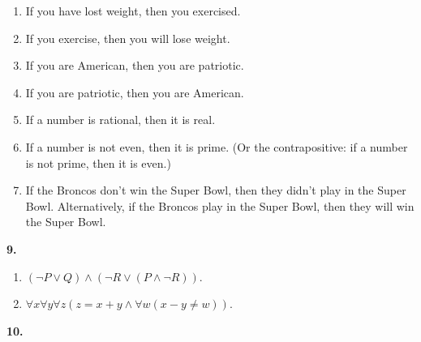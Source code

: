 \documentclass[10pt,]{book}
\theoremstyle{plain}
\theoremstyle{definition}
\theoremstyle{definition}
\theoremstyle{definition}
\numberwithin{equation}{chapter}
\begin{document}
\begin{enumerate}[label=(\alph*)]
\item\hypertarget{li-1160}{}
                If you have lost weight, then you exercised.
\item\hypertarget{li-1161}{}
                If you exercise, then you will lose weight.
\item\hypertarget{li-1162}{}
                If you are American, then you are patriotic.
\item\hypertarget{li-1163}{}
                If you are patriotic, then you are American.
\item\hypertarget{li-1164}{}
                If a number is rational, then it is real.
\item\hypertarget{li-1165}{}
                If a number is not even, then it is prime. (Or the contrapositive: if a number is not prime, then it is even.)
\item\hypertarget{li-1166}{}
                If the Broncos don't win the Super Bowl, then they didn't play in the Super Bowl. Alternatively, if the Broncos play in the Super Bowl, then they will win the Super Bowl.
\end{enumerate}
\par\smallskip
\noindent\textbf{9.}\quad{}\leavevmode%
\begin{enumerate}[label=(\alph*)]
\item\hypertarget{li-1169}{}\((\neg P \vee Q) \wedge (\neg R \vee (P \wedge \neg R))\).%
\item\hypertarget{li-1170}{}\(\forall x \forall y \forall z (z = x+y \wedge \forall w (x-y \ne w))\).%
\end{enumerate}
\par\smallskip
\noindent\textbf{10.}\quad{}\leavevmode%
\end{document}
